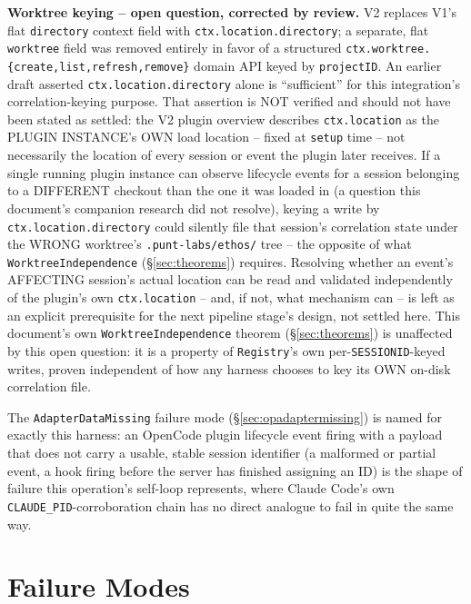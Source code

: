 \documentclass[a4paper,10pt,fleqn]{article}
\newcommand{\fpath}[1]{\texttt{#1}}
\newcommand{\field}[1]{\texttt{#1}}
\begin{document}
\textbf{Worktree keying -- open question, corrected by review.} V2
replaces V1's flat \field{directory} context field with
\field{ctx.location.directory}; a separate, flat \field{worktree} field
was removed entirely in favor of a structured
\field{ctx.worktree.\{create,list,refresh,remove\}} domain API keyed by
\field{projectID}. An earlier draft asserted
\field{ctx.location.directory} alone is ``sufficient'' for this
integration's correlation-keying purpose. That assertion is NOT
verified and should not have been stated as settled: the V2 plugin
overview describes \field{ctx.location} as the PLUGIN INSTANCE's OWN
load location -- fixed at \field{setup} time -- not necessarily the
location of every session or event the plugin later receives. If a
single running plugin instance can observe lifecycle events for a
session belonging to a DIFFERENT checkout than the one it was loaded
in (a question this document's companion research did not resolve),
keying a write by \field{ctx.location.directory} could silently file
that session's correlation state under the WRONG worktree's
\fpath{.punt-labs/ethos/} tree -- the opposite of what
\field{WorktreeIndependence} (\S\ref{sec:theorems}) requires. Resolving
whether an event's AFFECTING session's actual location can be read and
validated independently of the plugin's own \field{ctx.location} --
and, if not, what mechanism can -- is left as an explicit prerequisite
for the next pipeline stage's design, not settled here. This
document's own \field{WorktreeIndependence} theorem (\S\ref{sec:theorems})
is unaffected by this open question: it is a property of
\field{Registry}'s own per-\field{SESSIONID}-keyed writes, proven
independent of how any harness chooses to key its OWN on-disk
correlation file.

The \field{AdapterDataMissing} failure mode
(\S\ref{sec:opadaptermissing}) is named for exactly this harness: an
OpenCode plugin lifecycle event firing with a payload that does not
carry a usable, stable session identifier (a malformed or partial
event, a hook firing before the server has finished assigning an ID) is
the shape of failure this operation's self-loop represents, where
Claude Code's own \field{CLAUDE\_PID}-corroboration chain has no direct
analogue to fail in quite the same way.

\section{Failure Modes}
\label{sec:failure-modes}
\end{document}
